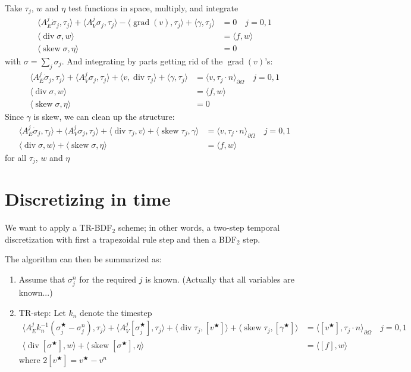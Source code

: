 \documentclass{amsart}
\DeclareMathOperator{\Div}{div}
\DeclareMathOperator{\Grad}{grad}
\DeclareMathOperator{\Skew}{skew}
\newcommand{\avg}[1]{[#1]}
\newcommand{\inner}[2]{\langle #1, #2 \rangle}
\begin{document}
Take $\tau_j$, $w$ and $\eta$ test functions in space, multiply, and
integrate
\begin{align}
  \inner{A_E^{j} \dot \sigma_j}{\tau_j} + \inner{A_{V}^{j} \sigma_j}{\tau_j} - \inner{\Grad(v)}{\tau_j} + \inner{\gamma}{\tau_j} &= 0
  \quad j = 0, 1 \\
  \inner{\Div \sigma}{w} & = \inner{f}{w} \\
  \inner{\Skew \sigma}{\eta} &= 0
\end{align}
with $\sigma = \sum_j \sigma_j$. And integrating by parts getting rid of the $\Grad(v)$'s:
\begin{align}
  \inner{A_E^{j} \dot \sigma_j}{\tau_j} + \inner{A_{V}^{j} \sigma_j}{\tau_j} + \inner{v}{\Div \tau_j} + \inner{\gamma}{\tau_j}  &= \inner{v}{\tau_j \cdot n}_{\partial \Omega}
  \quad j = 0, 1 \\
  \inner{\Div \sigma}{w} & = \inner{f}{w} \\
  \inner{\Skew \sigma}{\eta} &= 0
\end{align}
Since $\gamma$ is skew, we can clean up the structure:
\begin{align}
  \inner{A_E^{j} \dot \sigma_j}{\tau_j} + \inner{A_{V}^{j} \sigma_j}{\tau_j} + \inner{\Div \tau_j}{v} + \inner{\Skew \tau_j}{\gamma}  &= \inner{v}{\tau_j \cdot n}_{\partial \Omega}
  \quad j = 0, 1 \\
  \inner{\Div \sigma}{w} + \inner{\Skew \sigma}{\eta} & = \inner{f}{w}
\end{align}
for all $\tau_j$, $w$ and $\eta$

\section{Discretizing in time}

We want to apply a TR-BDF$_2$ scheme; in other words, a two-step
temporal discretization with first a trapezoidal rule step and then a
BDF$_2$ step.

The algorithm can then be summarized as:
\begin{enumerate}
\item
  Assume that $\sigma_j^{n}$ for the required $j$ is known. (Actually that all variables are known...)
\item
  TR-step: Let $k_n$ denote the timestep
  \begin{align}
    \inner{A_E^{j} k_n^{-1} (\sigma_j^{\bigstar} - \sigma_j^n)}{\tau_j}
    + \inner{A_{V}^{j} \avg{\sigma_j^{\bigstar} }}{\tau_j}
    + \inner{\Div \tau_j}{\avg{v^{\bigstar}} }
    + \inner{\Skew \tau_j}{\avg{\gamma^{\bigstar}}}
    &= \inner{\avg{v^{\bigstar}}}{\tau_j \cdot n}_{\partial \Omega}
    \quad j = 0, 1 \\
    \inner{\Div \avg{\sigma^{\bigstar}}}{w} + \inner{\Skew \avg{\sigma^{\bigstar}}}{\eta} & = \inner{\avg{f}}{w}
  \end{align}
  where $2 \avg{v^{\bigstar}} = v^{\bigstar} - v^{n}$
\end{enumerate}
\end{document}
